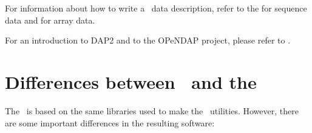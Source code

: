 For information about how to write a \ffnd\ data description, refer to
the  for sequence data and
 for array data. 

For an introduction to DAP2 and to the OPeNDAP project, please refer
to \DODSuser .






\section{Differences between \ffnd\ and the \ffs}
\label{sec,advanced}

The \ffs\ is based on the same libraries used to make the \ffnd\
utilities.  However, there are some important differences in the
resulting software:


